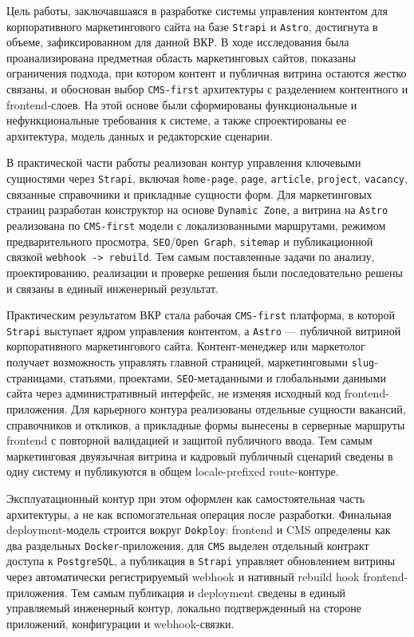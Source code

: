 
Цель работы, заключавшаяся в разработке системы управления контентом для корпоративного
маркетингового сайта на базе \texttt{Strapi} и \texttt{Astro}, достигнута в объеме,
зафиксированном для данной ВКР. В ходе исследования была проанализирована предметная
область маркетинговых сайтов, показаны ограничения подхода, при котором контент и
публичная витрина остаются жестко связаны, и обоснован выбор \texttt{CMS-first}
архитектуры с разделением контентного и frontend-слоев. На этой основе были сформированы
функциональные и нефункциональные требования к системе, а также спроектированы ее
архитектура, модель данных и редакторские сценарии.

В практической части работы реализован контур управления ключевыми сущностями через
\texttt{Strapi}, включая \texttt{home-page}, \texttt{page}, \texttt{article},
\texttt{project}, \texttt{vacancy}, связанные справочники и прикладные сущности форм.
Для маркетинговых страниц разработан конструктор на основе \texttt{Dynamic Zone}, а
витрина на \texttt{Astro} реализована по \texttt{CMS-first} модели с
локализованными маршрутами, режимом предварительного просмотра, \texttt{SEO}/\texttt{Open Graph},
\texttt{sitemap} и публикационной связкой \texttt{webhook -> rebuild}. Тем самым поставленные
задачи по анализу, проектированию, реализации и проверке решения были последовательно
решены и связаны в единый инженерный результат.


Практическим результатом ВКР стала рабочая \texttt{CMS-first} платформа, в которой
\texttt{Strapi} выступает ядром управления контентом, а \texttt{Astro} --- публичной
витриной корпоративного маркетингового сайта. Контент-менеджер или маркетолог получает
возможность управлять главной страницей, маркетинговыми \texttt{slug}-страницами,
статьями, проектами, \texttt{SEO}-метаданными и глобальными данными сайта через
административный интерфейс, не изменяя исходный код frontend-приложения. Для карьерного
контура реализованы отдельные сущности вакансий, справочников и откликов, а прикладные
формы вынесены в серверные маршруты frontend с повторной валидацией и защитой
публичного ввода. Тем самым маркетинговая двуязычная витрина и кадровый публичный
сценарий сведены в одну систему и публикуются в общем locale-prefixed route-контуре.

Эксплуатационный контур при этом оформлен как самостоятельная часть архитектуры, а не как
вспомогательная операция после разработки. Финальная deployment-модель строится вокруг
\texttt{Dokploy}: frontend и CMS определены как два раздельных \texttt{Docker}-приложения,
для \texttt{CMS} выделен отдельный контракт доступа к \texttt{PostgreSQL}, а публикация в
\texttt{Strapi} управляет обновлением витрины через автоматически регистрируемый webhook и нативный
rebuild hook frontend-приложения. Тем самым публикация и deployment сведены в единый
управляемый инженерный контур, локально подтвержденный на стороне приложений,
конфигурации и webhook-связки.

